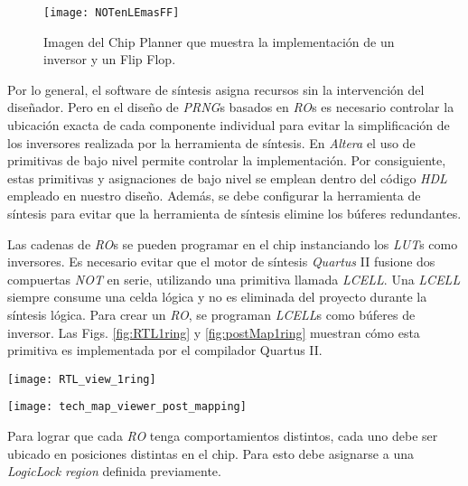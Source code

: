 \begin{figure}
\begin{center}
\texttt{[image: NOTenLEmasFF]}
\caption{Imagen del Chip Planner que muestra la implementación de un inversor y un Flip Flop.} \label{fig:LE}
\end{center}
\end{figure}

Por lo general, el software de síntesis asigna recursos sin la intervención del diseñador.
Pero en el diseño de \emph{PRNG}s basados en \emph{RO}s es necesario controlar la ubicación exacta de cada componente individual  para evitar la simplificación de los inversores realizada por la herramienta de síntesis.
En \emph{Altera} el uso de primitivas de bajo nivel permite controlar la implementación.
Por consiguiente, estas primitivas y asignaciones de bajo nivel se emplean dentro del código \emph{HDL} empleado en nuestro diseño.
Además, se debe configurar la herramienta de síntesis para evitar que la herramienta de síntesis elimine los búferes redundantes.

Las cadenas de \emph{RO}s se pueden programar en el chip instanciando los \emph{LUT}s como inversores.
Es necesario evitar que el motor de síntesis \emph{Quartus} II fusione dos compuertas \emph{NOT} en serie, utilizando una primitiva llamada \emph{LCELL}.
Una \emph{LCELL} siempre consume una celda lógica y no es eliminada del proyecto durante la síntesis lógica.
Para crear un \emph{RO}, se programan \emph{LCELL}s como búferes de inversor.
Las Figs. \ref{fig:RTL1ring} y \ref{fig:postMap1ring} muestran cómo esta primitiva es implementada por el compilador Quartus II.
%
\begin{figure*}
\begin{center}
\texttt{[image: RTL\_view\_1ring]}
\caption{Vista RTL de un ring con $3$ inversores.}
\label{fig:RTL1ring}
\end{center}
\end{figure*}
%
\begin{figure*}
\begin{center}
\texttt{[image: tech\_map\_viewer\_post\_mapping]}
\caption{Technology map viewer (post mapping) de un ring con $3$ inversores.} \label{fig:postMap1ring}
\end{center}
\end{figure*}

Para lograr que cada \emph{RO} tenga comportamientos distintos, cada uno debe ser ubicado en posiciones distintas en el chip.
Para esto debe asignarse a una \emph{LogicLock region} definida previamente.

